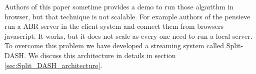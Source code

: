 Authors of this paper sometime provides a demo to run those algorithm in browser, but that technique is not scalable. For example authors of the pensieve run a ABR server in the client system and connect them from browsers javascript. It works, but it does not scale as every one need to run a local server. To overcome this problem we have developed a streaming system called Split-DASH. We discuss this architecture in details in section \ref{sec:Split_DASH_architecture}. 


 


